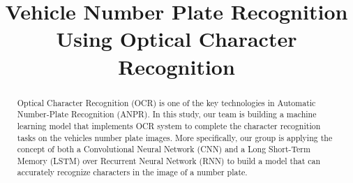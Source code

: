 \documentclass[conference]{IEEEtran}
\begin{document}
\title{Vehicle Number Plate Recognition Using Optical Character Recognition}

\author{
\and
{}
\and
{}
}

\maketitle

\begin{abstract}
Optical Character Recognition (OCR) is one of the key technologies in Automatic Number-Plate Recognition (ANPR). In this study, our team is building a machine learning model that implements OCR system to complete the character recognition tasks on the vehicles number plate images. More specifically, our group is applying the concept of both a Convolutional Neural Network (CNN) and a Long Short-Term Memory (LSTM) over Recurrent Neural Network (RNN) to build a model that can accurately recognize characters in the image of a number plate.
\end{abstract}
\end{document}
